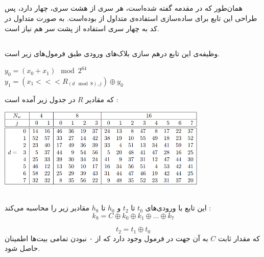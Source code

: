 \subsection{}
\label{subsec:TFBIG-MIX8}


همان‌طور که در مقدمه گفته‌ شده‌است،‌ هر سری از هشت سری، چهار  دارد، پس طراحی این تابع برای ساده‌سازی استفاده‌ی متداول از \hyperref[subsec:TFBIG-MIX]{} بوده‌است. به صورت متداول در کد به چهار سری استفاده از  پشت سر هم نیاز است. 


\subsection{}
\label{subsec:TFBIG-MIX}

وظیفه‌ی این تابع درهم سازی بلاک‌های ورودی طبق فرمول‌های زیر است.
\begin{center}
	$y_0 = (x_0 + x_1) \mod 2^{64}$ \\
	$ y_1 = (x_1 <<< R_{(d \mod 8), j}) \oplus y_0$
\end{center}
که مقادیر $ R $ در جدول زیر آمده است :

\begin{center}
	\includegraphics[width=10cm]{images/MIX1.png}
\end{center}




\subsection{}
\label{subsec:TFBIG-KINIT}
این تابع با ورودی‌های $ t_0 $ تا $ t_2 $ و $h_0 $ تا $ h_8 $ مقادیر زیر را محاسبه می‌کند :
$$
k_8 = C \oplus k_0 \oplus k_1 \oplus ... \oplus k_7
$$

$$
	t_2 = t_1 \oplus t_0
$$
 که مقدار ثابت $ C $ به آن جهت در فرمول وجود دارد که از ۰ نبودن تمامی بیت‌ها اطمینان حاصل شود.
 
\subsection{} 
\label{subsec:DECL-STATE-BIG}


